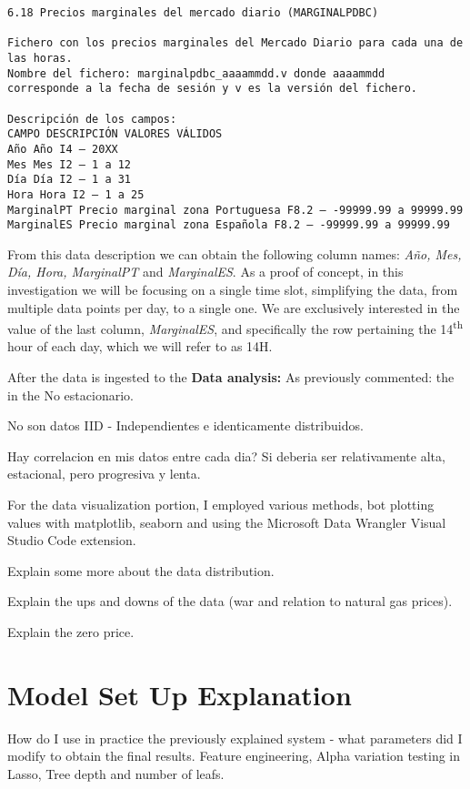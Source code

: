 \documentclass[12pt]{report} %
\begin{document}
\begin{small} %
\begin{verbatim}
6.18 Precios marginales del mercado diario (MARGINALPDBC)

Fichero con los precios marginales del Mercado Diario para cada una de
las horas.
Nombre del fichero: marginalpdbc_aaaammdd.v donde aaaammdd
corresponde a la fecha de sesión y v es la versión del fichero.

Descripción de los campos:
CAMPO DESCRIPCIÓN VALORES VÁLIDOS
Año Año I4 – 20XX
Mes Mes I2 – 1 a 12
Día Día I2 – 1 a 31
Hora Hora I2 – 1 a 25
MarginalPT Precio marginal zona Portuguesa F8.2 – -99999.99 a 99999.99
MarginalES Precio marginal zona Española F8.2 – -99999.99 a 99999.99
\end{verbatim}
\end{small}

From this data description we can obtain the following column names: \textit{Año, Mes, Día, Hora, MarginalPT} and \textit{MarginalES}. As a proof of concept, in this investigation we will be focusing on a single time slot, simplifying the data, from multiple data points per day, to a single one. We are exclusively interested in the value of the last column, \textit{MarginalES}, and specifically the row pertaining the 14\textsuperscript{th} hour of each day, which we will refer to as 14H.

After the data is ingested to the 
\noindent \textbf{Data analysis:}
As previously commented: the in the
No estacionario.

No son datos IID - Independientes e identicamente distribuidos.

Hay correlacion en mis datos entre cada dia? Si deberia ser relativamente alta, estacional, pero progresiva y lenta.

For the data visualization portion, I employed various methods, bot plotting values with matplotlib, seaborn and using the Microsoft Data Wrangler Visual Studio Code extension.

Explain some more about the data distribution.

Explain the ups and downs of the data (war and relation to natural gas prices).

Explain the zero price.


\section{Model Set Up Explanation}
How do I use in practice the previously explained system - what parameters did I modify to obtain the final results. Feature engineering, Alpha variation testing in Lasso, Tree depth and number of leafs.
\end{document}
